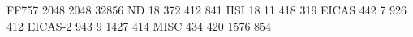 FF757 2048 2048 32856
ND       18  372  412  841
HSI      18   11  418  319
EICAS   442    7  926  412
EICAS-2 943    9 1427  414
MISC    434  420 1576  854
